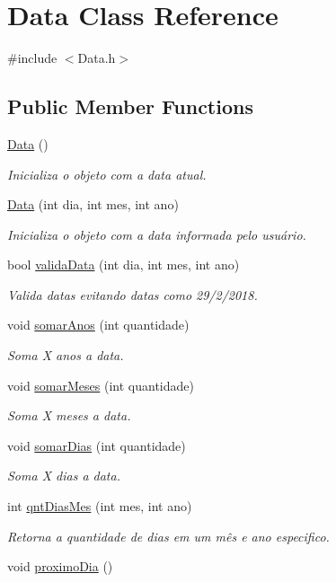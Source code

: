 \hypertarget{classData}{}\section{Data Class Reference}
\label{classData}


{\ttfamily \#include $<$Data.\+h$>$}

\subsection*{Public Member Functions}
\begin{DoxyCompactItemize}
\item 
\hyperlink{classData_af11f741cb7f587e2e495452a8905a22a}{Data} ()
\begin{DoxyCompactList}\small\item\em Inicializa o objeto com a data atual. \end{DoxyCompactList}\item 
\hyperlink{classData_a9eaa4c35a1bb04a39483d504fac0ac0a}{Data} (int dia, int mes, int ano)
\begin{DoxyCompactList}\small\item\em Inicializa o objeto com a data informada pelo usuário. \end{DoxyCompactList}\item 
bool \hyperlink{classData_a519fefa4af2ac86d1edf9c657be6090a}{valida\+Data} (int dia, int mes, int ano)
\begin{DoxyCompactList}\small\item\em Valida datas evitando datas como 29/2/2018. \end{DoxyCompactList}\item 
void \hyperlink{classData_a625e88a6e13f94a2c6d03a3784a0f940}{somar\+Anos} (int quantidade)
\begin{DoxyCompactList}\small\item\em Soma X anos a data. \end{DoxyCompactList}\item 
void \hyperlink{classData_a88bee1060434fa6447c909c35cbfd3fe}{somar\+Meses} (int quantidade)
\begin{DoxyCompactList}\small\item\em Soma X meses a data. \end{DoxyCompactList}\item 
void \hyperlink{classData_a69f64da1089e3281d0c0114533cd0ae1}{somar\+Dias} (int quantidade)
\begin{DoxyCompactList}\small\item\em Soma X dias a data. \end{DoxyCompactList}\item 
int \hyperlink{classData_a8471bef98166420ae3be64396861a8b8}{qnt\+Dias\+Mes} (int mes, int ano)
\begin{DoxyCompactList}\small\item\em Retorna a quantidade de dias em um mês e ano especifico. \end{DoxyCompactList}\item 
void \hyperlink{classData_a9d7a1ba5561e5a1cfb7bc0162c76a7c5}{proximo\+Dia} ()
\end{DoxyCompactItemize}
